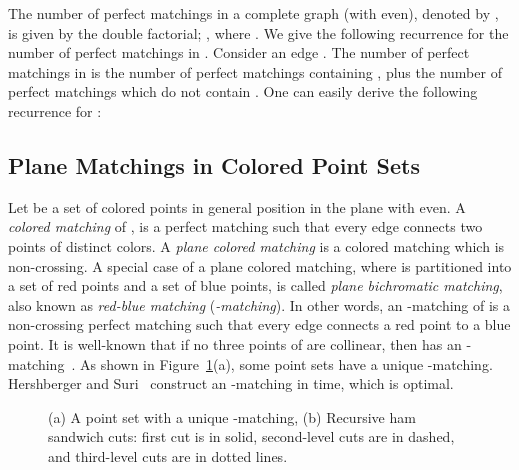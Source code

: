 \documentclass[11pt,a4paper]{article}
\begin{document}
The number of perfect matchings in a complete graph  (with  even), denoted by , is given by the double factorial;  \cite{Callan2009}, where . We give the following recurrence for the number of perfect matchings in . Consider an edge . The number of perfect matchings in  is the number of perfect matchings containing , plus the number of perfect matchings which do not contain . One can easily derive the following recurrence for : 


\subsection{Plane Matchings in Colored Point Sets}
\label{colored-matching-section}
Let  be a set of  colored points in general position in the plane with  even. A {\em colored matching} of , is a perfect matching such that every edge connects two points of distinct colors. A {\em plane colored matching} is a colored matching which is non-crossing.  
A special case of a plane colored matching, where  is partitioned into a set  of  red points and a set  of  blue points, is called {\em plane bichromatic matching}, also known as {\em red-blue matching} ({\em-matching}). In other words, an -matching of  is a non-crossing perfect matching such that every edge connects a red point to a blue point. It is well-known that if no three points of  are collinear, then  has an -matching~\cite{Putnam1979}. As shown in Figure~\ref{RB-fig}(a), some point sets have a unique -matching. Hershberger and Suri~\cite{Hershberger1992} construct an -matching in  time, which is optimal.

\begin{figure}[htb]
  \centering
\setlength{\tabcolsep}{0in}
  
  \caption{(a) A point set with a unique -matching, (b) Recursive ham sandwich cuts: first cut is in solid, second-level cuts are in dashed, and third-level cuts are in dotted lines.}
\label{RB-fig}
\end{figure}
\end{document}
